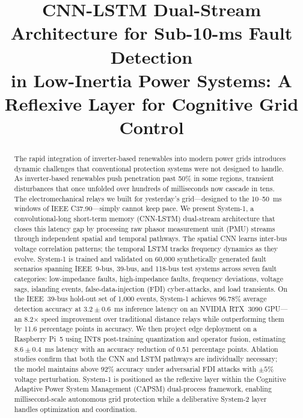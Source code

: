 \documentclass[journal]{IEEEtran}
\begin{document}
\title{CNN-LSTM Dual-Stream Architecture for Sub-10-ms Fault Detection\\ in Low-Inertia Power Systems: A Reflexive Layer for Cognitive Grid Control}

\author{
}


\maketitle

\begin{abstract}
The rapid integration of inverter-based renewables into modern power grids introduces dynamic challenges that conventional protection systems were not designed to handle. As inverter-based renewables push penetration past 50\% in some regions, transient disturbances that once unfolded over hundreds of milliseconds now cascade in tens. The electromechanical relays we built for yesterday's grid---designed to the 10--50~ms windows of IEEE C37.90---simply cannot keep pace. We present System-1, a convolutional-long short-term memory (CNN-LSTM) dual-stream architecture that closes this latency gap by processing raw phasor measurement unit (PMU) streams through independent spatial and temporal pathways. The spatial CNN learns inter-bus voltage correlation patterns; the temporal LSTM tracks frequency dynamics as they evolve. System-1 is trained and validated on 60,000 synthetically generated fault scenarios spanning IEEE~9-bus, 39-bus, and 118-bus test systems across seven fault categories: low-impedance faults, high-impedance faults, frequency deviations, voltage sags, islanding events, false-data-injection (FDI) cyber-attacks, and load transients. On the IEEE~39-bus hold-out set of 1,000 events, System-1 achieves 96.78\% average detection accuracy at $3.2 \pm 0.6$~ms inference latency on an NVIDIA RTX~3090 GPU---an 8.2$\times$ speed improvement over traditional distance relays while outperforming them by 11.6 percentage points in accuracy. We then project edge deployment on a Raspberry Pi~5 using INT8 post-training quantization and operator fusion, estimating $8.6 \pm 0.4$~ms latency with an accuracy reduction of 0.51 percentage points. Ablation studies confirm that both the CNN and LSTM pathways are individually necessary; the model maintains above 92\% accuracy under adversarial FDI attacks with $\pm5\%$ voltage perturbation. System-1 is positioned as the reflexive layer within the Cognitive Adaptive Power System Management (CAPSM) dual-process framework, enabling millisecond-scale autonomous grid protection while a deliberative System-2 layer handles optimization and coordination.
\end{abstract}
\end{document}
